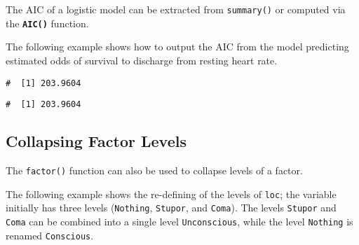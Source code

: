 \documentclass[letterpaper,12pt,twoside,]{pinp}
\begin{document}
The AIC of a logistic model can be extracted from \texttt{summary()} or
computed via the \textbf{\texttt{AIC()}} function.

The following example shows how to output the AIC from the model
predicting estimated odds of survival to discharge from resting heart
rate.

\begin{Shaded}
\begin{Highlighting}[]
\OperatorTok{$}
\end{Highlighting}
\end{Shaded}

\begin{ShadedResult}
\begin{verbatim}
#  [1] 203.9604
\end{verbatim}
\end{ShadedResult}

\begin{Shaded}
\begin{Highlighting}[]
\end{Highlighting}
\end{Shaded}

\begin{ShadedResult}
\begin{verbatim}
#  [1] 203.9604
\end{verbatim}
\end{ShadedResult}

\hypertarget{collapsing-factor-levels}{%
\subsection{Collapsing Factor Levels}\label{collapsing-factor-levels}}

The \texttt{factor()} function can also be used to collapse levels of a
factor.

The following example shows the re-defining of the levels of
\texttt{loc}; the variable initially has three levels (\texttt{Nothing},
\texttt{Stupor}, and \texttt{Coma}). The levels \texttt{Stupor} and
\texttt{Coma} can be combined into a single level \texttt{Unconscious},
while the level \texttt{Nothing} is renamed \texttt{Conscious}.

\begin{Shaded}
\begin{Highlighting}[]
\OperatorTok{$}
\end{Highlighting}
\end{Shaded}
\end{document}
